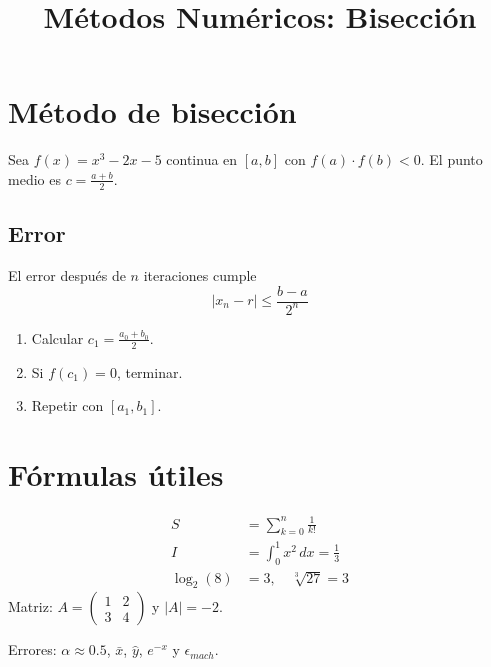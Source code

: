 \documentclass{article}
\title{Métodos Numéricos: Bisección}
\begin{document}
\maketitle

\section{Método de bisección}
Sea $f(x) = x^3 - 2x - 5$ continua en $[a,b]$ con $f(a) \cdot f(b) < 0$.
El punto medio es $c = \frac{a+b}{2}$.

\subsection{Error}
El error después de $n$ iteraciones cumple
\[ |x_n - r| \le \frac{b-a}{2^{n}} \]

\begin{enumerate}
  \item Calcular $c_1 = \frac{a_0 + b_0}{2}$.
  \item Si $f(c_1) = 0$, terminar.
  \item Repetir con $[a_1, b_1]$.
\end{enumerate}

\section{Fórmulas útiles}
\begin{align*}
  S &= \sum_{k=0}^{n} \frac{1}{k!} \\
  I &= \int_0^1 x^2 \, dx = \frac{1}{3} \\
  \log_2(8) &= 3, \quad \sqrt[3]{27} = 3
\end{align*}
Matriz: $A = \begin{pmatrix} 1 & 2 \\ 3 & 4 \end{pmatrix}$ y $|A| = -2$.

Errores: $\alpha \approx 0.5$, $\bar{x}$, $\hat{y}$, $e^{-x}$ y $\epsilon_{mach}$.
\end{document}
